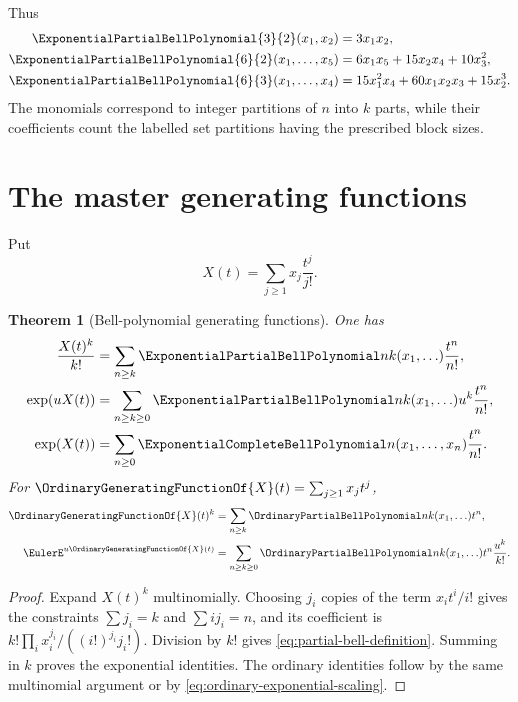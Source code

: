 \documentclass[11pt,a4paper,oneside,openany]{book}
\newtheorem{theorem}{Theorem}[chapter]
\theoremstyle{definition}
\theoremstyle{remark}
\begin{document}
Thus
\begin{align*}
 \ExponentialPartialBellPolynomial{3}{2}(x_1,x_2)&=3x_1x_2,\\
 \ExponentialPartialBellPolynomial{6}{2}(x_1,\ldots,x_5)&=6x_1x_5+15x_2x_4+10x_3^2,\\
 \ExponentialPartialBellPolynomial{6}{3}(x_1,\ldots,x_4)&=15x_1^2x_4+60x_1x_2x_3+15x_2^3.
\end{align*}
The monomials correspond to integer partitions of $n$ into $k$ parts, while their
coefficients count the labelled set partitions having the prescribed block sizes.

\section{The master generating functions}
Put
\[
 X(t)=\sum_{j\ge1}x_j\frac{t^j}{j!}.
\]
\begin{theorem}[Bell-polynomial generating functions]\label{thm:bell-poly-egf}
One has
\begin{align}
 \frac{X(t)^k}{k!}
 &=\sum_{n\ge k}\ExponentialPartialBellPolynomial nk(x_1,\ldots)\frac{t^n}{n!},\\
 \exp(uX(t))
 &=\sum_{n\ge k\ge0}\ExponentialPartialBellPolynomial nk(x_1,\ldots)u^k\frac{t^n}{n!},\\
 \exp(X(t))
 &=\sum_{n\ge0}\ExponentialCompleteBellPolynomial n(x_1,\ldots,x_n)\frac{t^n}{n!}.
\end{align}
For $\OrdinaryGeneratingFunctionOf{X}(t)=\sum_{j\ge1}x_jt^j$,
\begin{align}
 \OrdinaryGeneratingFunctionOf{X}(t)^k&=\sum_{n\ge k}\OrdinaryPartialBellPolynomial nk(x_1,\ldots)t^n,
 \label{eq:ordinary-bell-ogf}\\
 \EulerE^{u\OrdinaryGeneratingFunctionOf{X}(t)}
 &=\sum_{n\ge k\ge0}\OrdinaryPartialBellPolynomial nk(x_1,\ldots)t^n\frac{u^k}{k!}.
 \label{eq:ordinary-bell-bivariate}
\end{align}
\end{theorem}
\begin{proof}
Expand $X(t)^k$ multinomially.  Choosing $j_i$ copies of the term
$x_it^i/i!$ gives the constraints $\sum j_i=k$ and $\sum ij_i=n$, and its
coefficient is $k!\prod_i x_i^{j_i}/((i!)^{j_i}j_i!)$.  Division by $k!$ gives
\eqref{eq:partial-bell-definition}.  Summing in $k$ proves the exponential
identities.  The ordinary identities follow by the same multinomial argument or
by \eqref{eq:ordinary-exponential-scaling}.
\end{proof}
\end{document}
